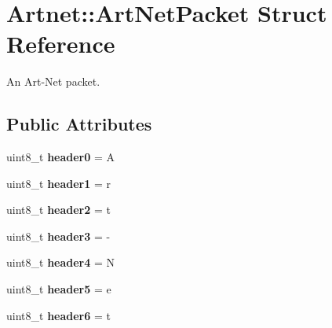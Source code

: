 \hypertarget{structArtnet_1_1ArtNetPacket}{}\section{Artnet\+:\+:Art\+Net\+Packet Struct Reference}
\label{structArtnet_1_1ArtNetPacket}


An Art-\/\+Net packet.  


\subsection*{Public Attributes}
\begin{DoxyCompactItemize}
\item 
\mbox{\label{structArtnet_1_1ArtNetPacket_a6bb1f7f98e789604dc21a15bedc21943}} 
uint8\+\_\+t {\bfseries header0} = \textquotesingle{}A\textquotesingle{}
\item 
\mbox{\label{structArtnet_1_1ArtNetPacket_a96d5bac6c1acf57aac89ca574d890140}} 
uint8\+\_\+t {\bfseries header1} = \textquotesingle{}r\textquotesingle{}
\item 
\mbox{\label{structArtnet_1_1ArtNetPacket_afd50599c5e6ae3abc58abcd8675438a9}} 
uint8\+\_\+t {\bfseries header2} = \textquotesingle{}t\textquotesingle{}
\item 
\mbox{\label{structArtnet_1_1ArtNetPacket_a7de8fc6b33c3998967d2e7c4c3b3beda}} 
uint8\+\_\+t {\bfseries header3} = \textquotesingle{}-\/\textquotesingle{}
\item 
\mbox{\label{structArtnet_1_1ArtNetPacket_a7f54adcee3aaed55e4e89cbcb5141908}} 
uint8\+\_\+t {\bfseries header4} = \textquotesingle{}N\textquotesingle{}
\item 
\mbox{\label{structArtnet_1_1ArtNetPacket_a95171885811287edfe8170f6e9cbc3b2}} 
uint8\+\_\+t {\bfseries header5} = \textquotesingle{}e\textquotesingle{}
\item 
\mbox{\label{structArtnet_1_1ArtNetPacket_a40a2523a58975b8bc9e53ecf4e1ff778}} 
uint8\+\_\+t {\bfseries header6} = \textquotesingle{}t\textquotesingle{}

\end{DoxyCompactItemize}
